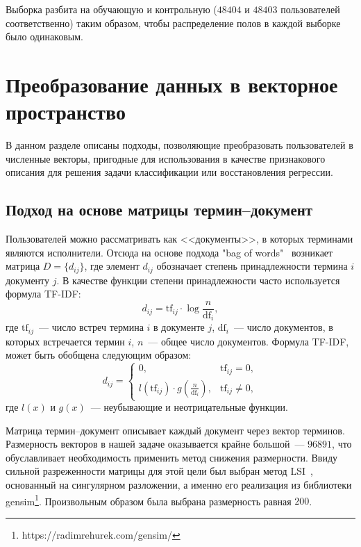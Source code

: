 \documentclass{spisok-article}
\begin{document}
Выборка разбита на обучающую и контрольную ($48404$ и $48403$
пользователей соответственно) таким образом, чтобы распределение
полов в каждой выборке было одинаковым.

\section{Преобразование данных в векторное пространство}

В данном разделе описаны подходы, позволяющие преобразовать
пользователей в численные векторы, пригодные для
использования в качестве признакового описания для решения
задачи классификации или восстановления регрессии.

\subsection{Подход на основе матрицы термин--документ}
Пользователей можно рассматривать как <<документы>>, в
которых терминами являются исполнители. Отсюда на основе
подхода "bag of words"~\cite{manning} 
возникает матрица $D = \{d_{ij}\}$, где элемент $d_{ij}$
обозначает степень принадлежности термина $i$ документу $j$.
В качестве функции степени принадлежности часто используется формула TF-IDF:
\begin{equation} \label{eq:tfidf}
    d_{ij} = \mathrm{tf}_{ij} \cdot \log{\frac{n}{\mathrm{df}_{i}}},
\end{equation}
где $\mathrm{tf}_{ij}$~--- число встреч термина $i$ в документе $j$,
$\mathrm{df}_{i}$~--- число документов, в которых встречается термин $i$,
$n$~--- общее число документов.
Формула TF-IDF, может быть обобщена следующим образом:
\begin{equation} \label{eq:general_tfidf}
d_{ij} = 
\begin{cases}
    0,& \mathrm{tf}_{ij} = 0,\\
    l(\mathrm{tf}_{ij}) \cdot g(\frac{n}{\mathrm{df}_{i}}),& \mathrm{tf}_{ij} \ne 0,
\end{cases}
\end{equation}
где $l(x)$ и $g(x)$~--- неубывающие и неотрицательные функции.

Матрица термин--документ описывает каждый документ через вектор
терминов. Размерность векторов в нашей задаче оказывается
крайне большой~--- $96891$, что обуславливает необходимость 
применить метод снижения размерности. Ввиду сильной разреженности
матрицы для этой цели был выбран метод LSI~\cite{lsi}, основанный
на сингулярном разложении, а именно его реализация из библиотеки
gensim\footnote{https://radimrehurek.com/gensim/}. Произвольным
образом была выбрана размерность равная $200$. 
\end{document}
